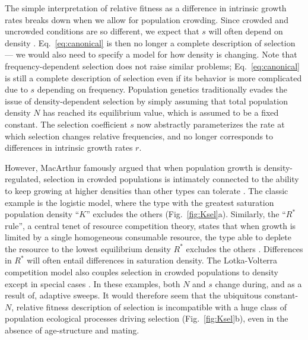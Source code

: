 \documentclass[12pt]{article}
\begin{document}
The simple interpretation of relative fitness as a difference in intrinsic growth rates breaks down when we allow for population crowding. Since crowded and uncrowded conditions are so different, we expect that $s$ will often depend on density \citep{travis_2013}. Eq.~\eqref{eq:canonical} is then no longer a complete description of selection --- we would also need to specify a model for how density is changing. Note that frequency-dependent selection does not raise similar problems; Eq.~\eqref{eq:canonical} is still a complete description of selection even if its behavior is more complicated due to $s$ depending on frequency. Population genetics traditionally evades the issue of density-dependent selection by simply assuming that total population density $N$ has reached its equilibrium value, which is assumed to be a fixed constant. The selection coefficient $s$ now abstractly parameterizes the rate at which selection changes relative frequencies, and no longer corresponds to differences in intrinsic growth rates $r$. 

However, MacArthur famously argued that when population growth is density-regulated, selection in crowded populations is intimately connected to the ability to keep growing at higher densities than other types can tolerate \citep{macarthur_1967}. The classic example is the logistic model, where the type with the greatest saturation population density ``$K$'' excludes the others (Fig.~\ref{fig:Ksel}a). Similarly, the ``$R^*$ rule'', a central tenet of resource competition theory, states that when growth is limited by a single homogeneous consumable resource, the type able to deplete the resource to the lowest equilibrium density $R^*$ excludes the others \citep{grover_1997}. Differences in $R^*$ will often entail differences in saturation density. The Lotka-Volterra competition model also couples selection in crowded populations to density except in special cases \citep{smouse_1976,mallet_2012}. In these examples, both $N$ and $s$ change during, and as a result of, adaptive sweeps. It would therefore seem that the ubiquitous constant-$N$, relative fitness description of selection is incompatible with a huge class of population ecological processes driving selection (Fig.~\ref{fig:Ksel}b), even in the absence of age-structure and mating.
\end{document}
